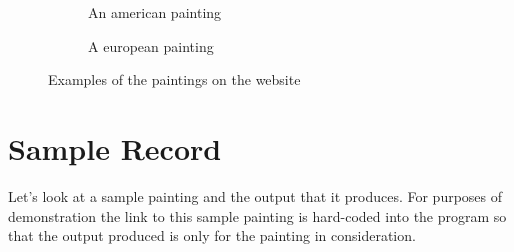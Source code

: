 \documentclass{article}
\begin{document}
\begin{flushleft}
\begin{figure}[h]
\centering
\begin{subfigure}{0.5\textwidth}
\centering
{}
\caption{An american painting}
\end{subfigure}%
\begin{subfigure}{0.5\textwidth}
\centering
{}
\caption{A european painting}
\end{subfigure}
\caption{Examples of the paintings on the website}
\end{figure}
\newpage
\section{Sample Record}
Let's look at a sample painting and the output that it produces. For purposes of demonstration the link to this sample painting is hard-coded into the program so that the output produced is only for the painting in consideration.


\end{flushleft}
\end{document}
